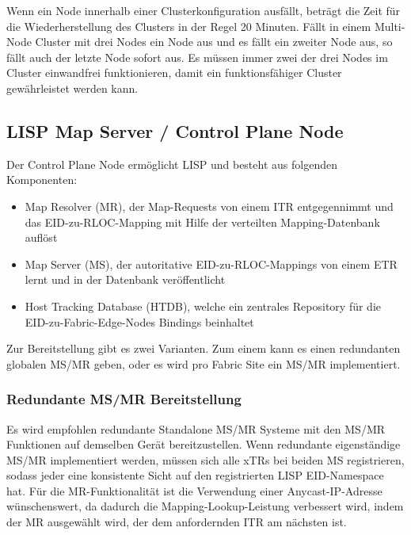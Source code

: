Wenn ein Node innerhalb einer Clusterkonfiguration ausfällt, beträgt die Zeit für die Wiederherstellung des Clusters in der Regel 20 Minuten. Fällt in einem Multi-Node Cluster mit drei Nodes ein Node aus und es fällt ein zweiter Node aus, so fällt auch der letzte Node sofort aus. Es müssen immer zwei der drei Nodes im Cluster einwandfrei funktionieren, damit ein funktionsfähiger Cluster gewährleistet werden kann.





\subsection{LISP Map Server / Control Plane Node}
Der Control Plane Node ermöglicht LISP und besteht aus folgenden Komponenten:
\begin{itemize}
	\item Map Resolver (MR), der Map-Requests von einem ITR entgegennimmt und das EID-zu-RLOC-Mapping mit Hilfe der verteilten Mapping-Datenbank auflöst
	\item Map Server (MS), der autoritative EID-zu-RLOC-Mappings von einem ETR lernt und in der Datenbank veröffentlicht
	\item Host Tracking Database (HTDB), welche ein zentrales Repository für die EID-zu-Fabric-Edge-Nodes Bindings beinhaltet
\end{itemize}

Zur Bereitstellung gibt es zwei Varianten. Zum einem kann es einen redundanten globalen MS/MR geben, oder es wird pro Fabric Site ein MS/MR implementiert.

\subsubsection{Redundante MS/MR Bereitstellung}

Es wird empfohlen redundante Standalone MS/MR Systeme mit den MS/MR Funktionen auf demselben Gerät bereitzustellen. Wenn redundante eigenständige MS/MR implementiert werden, müssen sich alle xTRs bei beiden MS registrieren, sodass jeder eine konsistente Sicht auf den registrierten LISP EID-Namespace hat. Für die MR-Funktionalität ist die Verwendung einer Anycast-IP-Adresse wünschenswert, da dadurch die Mapping-Lookup-Leistung verbessert wird, indem der MR ausgewählt wird, der dem anfordernden ITR am nächsten ist.

